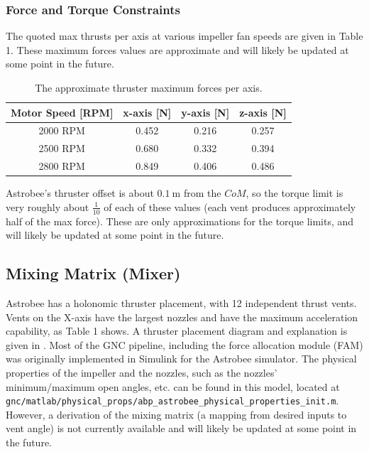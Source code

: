 \documentclass{article}
\begin{document}
\subsubsection{Force and Torque Constraints}

The quoted max thrusts per axis at various impeller fan speeds are given in Table 1. These maximum forces values are approximate and will likely be updated at some point in the future.

\begin{table}[h!]
\centering
\begin{tabular}{ |c|c|c|c| } 
    \hline
    Motor Speed [RPM]& x-axis [N]& y-axis [N]& z-axis [N] \\
    \hline
    2000 RPM & 0.452 & 0.216 & 0.257 \\
     \hline
    2500 RPM & 0.680 & 0.332 & 0.394 \\
     \hline
    2800 RPM & 0.849 & 0.406 & 0.486 \\
     \hline
\end{tabular}
     \label{table:speeds}
     \caption{The approximate thruster maximum forces per axis.}
\end{table}

\noindent Astrobee's thruster offset is about $0.1\ \text{m}$ from the $CoM$, so the torque limit is very roughly about $\frac{1}{10}$ of each of these values (each vent produces approximately half of the max force). These are only approximations for the torque limits, and will likely be updated at some point in the future.
     
\subsection{Mixing Matrix (Mixer)} 
Astrobee has a holonomic thruster placement, with 12 independent thrust vents. Vents on the X-axis have the largest nozzles and have the maximum acceleration capability, as Table 1 shows. A thruster placement diagram and explanation is given in \cite{Smith2016}. Most of the GNC pipeline, including the force allocation module (FAM) was originally implemented in Simulink for the Astrobee simulator. The physical properties of the impeller and the nozzles, such as the nozzles' minimum/maximum open angles, etc. can be found in this model, located at\\ \texttt{gnc/matlab/physical\_props/abp\_astrobee\_physical\_properties\_init.m}. However, a derivation of the mixing matrix (a mapping from desired inputs to vent angle) is not currently available and will likely be updated at some point in the future.
\end{document}
